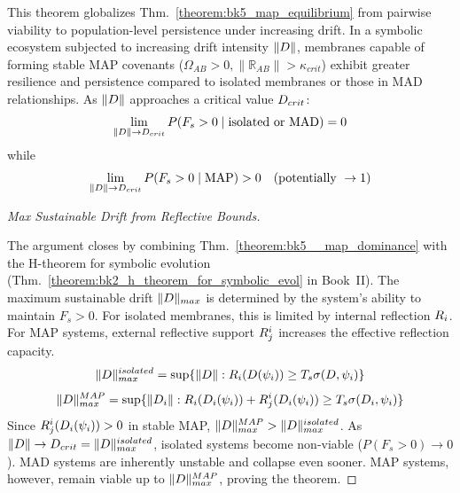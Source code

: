 \begin{theorem}
\label{theorem:bk5__map_dominance}
This theorem globalizes Thm.~\ref{theorem:bk5_map_equilibrium} from pairwise viability to population-level persistence under increasing drift.
In a symbolic ecosystem subjected to increasing drift intensity $\|D\|$, membranes capable of forming stable MAP covenants ($\Omega_{AB}>0, \|\mathbb{R}_{AB}\| > \kappa_{crit}$) exhibit greater resilience and persistence compared to isolated membranes or those in MAD relationships. As $\|D\|$ approaches a critical value $D_{crit}$:
\begin{equation}
\lim_{\|D\| \to D_{crit}} P(F_s > 0 \mid \text{isolated or MAD}) = 0
\end{equation}
while
\begin{equation}
\lim_{\|D\| \to D_{crit}} P(F_s > 0 \mid \text{MAP}) > 0 \quad (\text{potentially } \to 1)
\end{equation}
\end{theorem}
\begin{proof}[Max Sustainable Drift from Reflective Bounds]
\label{proof:bk5_max_sustainable_drift}
\leavevmode

The argument closes by combining Thm.~\ref{theorem:bk5__map_dominance}
with the H-theorem for symbolic evolution
(Thm.~\ref{theorem:bk2_h_theorem_for_symbolic_evol} in Book~II).
The maximum sustainable drift $\|D\|_{max}$ is determined by the system's ability to maintain $F_s > 0$. For isolated membranes, this is limited by internal reflection $R_i$. For MAP systems, external reflective support $R_j^i$ increases the effective reflection capacity.
\begin{equation}
\|D\|_{max}^{isolated} = \sup \{\|D\| : R_i(D(\psi_i)) \geq T_s \sigma(D, \psi_i) \}
\end{equation}
\begin{equation}
\|D\|_{max}^{MAP} = \sup \{\|D_i\| : R_i(D_i(\psi_i)) + R_j^i(D_i(\psi_i)) \geq T_s \sigma(D_i, \psi_i) \}
\end{equation}
Since $R_j^i(D_i(\psi_i)) > 0$ in stable MAP, $\|D\|_{max}^{MAP} > \|D\|_{max}^{isolated}$. As $\|D\| \to D_{crit} = \|D\|_{max}^{isolated}$, isolated systems become non-viable ($P(F_s>0) \to 0$). MAD systems are inherently unstable and collapse even sooner. MAP systems, however, remain viable up to $\|D\|_{max}^{MAP}$, proving the theorem.
\end{proof}
